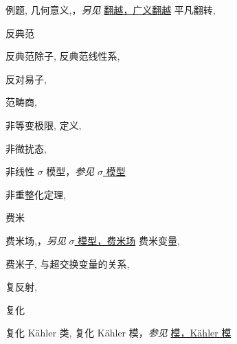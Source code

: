 \begin{theindex}
\subitem \leavevmode\hypertarget{idx:0329}{例题},\enspace{}
\subitem \leavevmode\hypertarget{idx:0330}{几何意义},\enspace{}，\textit{另见} \hyperlink{idx:0334}{翻越，广义翻越}
\subitem \leavevmode\hypertarget{idx:0331}{平凡翻转},\enspace{}
\indexspace
\item \leavevmode\hypertarget{idx:0050}{反典范}
\subitem \leavevmode\hypertarget{idx:0051}{反典范除子},\enspace{}
\subitem \leavevmode\hypertarget{idx:0052}{反典范线性系},\enspace{}
\indexspace
\item \leavevmode\hypertarget{idx:0053}{反对易子},\enspace{}
\indexspace
\item \leavevmode\hypertarget{idx:0114}{范畴商},\enspace{}
\indexspace
\item \leavevmode\hypertarget{idx:0945}{非等变极限},\enspace{}
\subitem \leavevmode\hypertarget{idx:0946}{定义},\enspace{}
\indexspace
\item \leavevmode\hypertarget{idx:0943}{非微扰态},\enspace{}
\indexspace
\item \leavevmode\hypertarget{idx:0942}{非线性 $\sigma$ 模型}，\textit{参见} \hyperlink{idx:1249}{$\sigma$ 模型}
\indexspace
\item \leavevmode\hypertarget{idx:0944}{非重整化定理},\enspace{}
\indexspace
\item \leavevmode\hypertarget{idx:0311}{费米}
\subitem \leavevmode\hypertarget{idx:0312}{费米场},\enspace{}，\textit{另见} \hyperlink{idx:1253}{$\sigma$ 模型，费米场}
\subitem \leavevmode\hypertarget{idx:0313}{费米变量},\enspace{}
\indexspace
\item \leavevmode\hypertarget{idx:0309}{费米子},\enspace{}
\subitem \leavevmode\hypertarget{idx:0310}{与超交换变量的关系},\enspace{}
\indexspace
\item \leavevmode\hypertarget{idx:0139}{复反射},\enspace{}
\indexspace
\item \leavevmode\hypertarget{idx:0140}{复化}
\subitem \leavevmode\hypertarget{idx:0141}{复化 Kähler 类},\enspace{}
\subitem \leavevmode\hypertarget{idx:0142}{复化 Kähler 模}，\textit{参见} \hyperlink{idx:0882}{模，Kähler 模}

\end{theindex}
